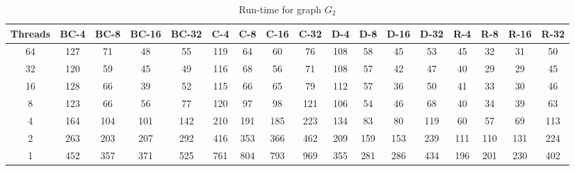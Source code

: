 \begin{table}[t]
\begin{minipage}[b]{\textwidth}
\caption{Run-time  for graph $G_2$}
\label{tab:graph2}
{\small
\begin{tabular}{||c||c|c|c|c||c|c|c|c||c|c|c|c||c|c|c|c|}
\hline
\textbf{Threads}	&\cellcolor{black!10}BC-4&	\cellcolor{black!10}BC-8	&\cellcolor{black!10}BC-16	&\cellcolor{black!10}BC-32&	\cellcolor{black!10}C-4	&\cellcolor{black!10}C-8&	\cellcolor{black!10}C-16&	\cellcolor{black!10}C-32&	\cellcolor{black!10}D-4&	\cellcolor{black!10}D-8	&\cellcolor{black!10}D-16&\cellcolor{black!10}	D-32&	\cellcolor{black!10}R-4	&\cellcolor{black!10}R-8&	\cellcolor{black!10}R-16&	\cellcolor{black!10}R-32 \\ \hline \hline
64		&127	&71	&48	&55	&119	&64	&60	&76	&108	&58	&45	&53	&45	&32	&31	&50		 \\ \hline		
32		&120	&59	&45	&49	&116	&68	&56	&71	&108	&57	&42	&47	&40	&29	&29	&45		 \\ \hline			
16		&128	&66	&39	&52	&115	&66	&65	&79	&112	&57	&36	&50	&41	&33	&30	&46 \\ \hline				
8		&123	&66	&56	&77	&120	&97	&98	&121	&106	&54	&46	&68	&40	&34	&39	&63	 \\ \hline			
4		&164	&104	&101	&142	&210	&191	&185	&223	&134	&83	&80	&119	&60	&57	&69	&113	 \\ \hline			
2		&263	&203	&207	&292	&416	&353	&366	&462	&209	&159	&153	&239	&111	&110	&131	&224	 \\ \hline		
1		&452&357	&371	&525	&761	&804	&793	&969	&355	&281	&286	&434	&196	&201	&230	&402 \\ \hline		
\end{tabular}
}
\end{minipage}
\end{table}

